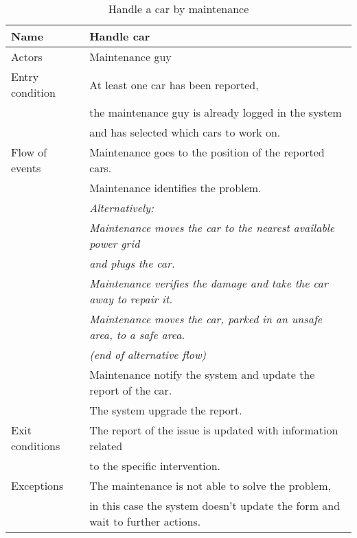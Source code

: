 \documentclass[10pt, a4paper,titlepage]{article}
\begin{document}
\begin{table}[h]
\caption{Handle a car by maintenance} \label{tab:scenario12}
\begin{tabular}{|l|l|}
\hline
Name & Handle car\\
\hline
Actors & Maintenance guy\\ 
\hline
Entry condition & At least one car has been reported, \\
& the maintenance guy is already logged in the system\\
& and has selected which cars to work on.\\
\hline
Flow of events & Maintenance goes to the position of the reported cars.\\
& Maintenance identifies the problem.\\
& \textit{Alternatively:}\\
& \textit{Maintenance moves the car to the nearest available power grid}\\
& \textit{and plugs the car.}\\
& \textit{Maintenance verifies the damage and take the car away to repair it.}\\
& \textit{Maintenance moves the car, parked in an unsafe area, to a safe area.}\\
& \textit{(end of alternative flow)}\\
& Maintenance notify the system and update the report of the car.\\
& The system upgrade the report.\\
\hline
Exit conditions & The report of the issue is updated with information related \\
& to the specific intervention.\\
\hline
Exceptions & The maintenance is not able to solve the problem, \\
& in this case the system doesn’t update the form and wait to further actions.\\
\hline
\end{tabular}
\end{table}
\end{document}
